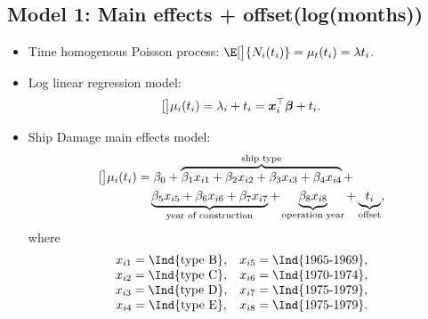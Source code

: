 \documentclass{article}\usepackage[]{graphicx}\usepackage[svgnames]{xcolor}
\let\log\relax%
\providecommand{\Vector}[1]{\bm{#1}}%
\begin{document}
\subsection*{Model 1: Main effects + offset(log(months))}
\begin{itemize}
      \item Time homogenous Poisson process: $ \E[\big]{N_i(t_i)}=\mu_t(t_i)=\lambda t_i $.
      \item Log linear regression model:
            \[ \log[\big]{\mu_i(t_i)}=\log{\lambda_i}+\log{t_i}=\Vector{x}_i^\top \Vector{\beta}+\log{t_i}. \]
      \item Ship Damage main effects model:
            \begin{align*}
                  \log[\big]{\mu_i(t_i)}
                   & =\beta_0+\overbrace{\beta_1x_{i1}+\beta_2x_{i2}+\beta_3x_{i3}+\beta_4x_{i4}}^{\text{ship type}}+ \\
                   & \quad \underbrace{\beta_5x_{i5}+\beta_6x_{i6}+\beta_7x_{i7}}_{\text{year of construction}}+
                  \underbrace{\beta_8x_{i8}}_{\text{operation year}}+\underbrace{\log{t_i}}_{\text{offset}},
            \end{align*}
            where
            \[ \begin{array}{cc}
                        x_{i1}=\Ind{\text{type B}}, & x_{i5}=\Ind{\text{1965-1969}}, \\
                        x_{i2}=\Ind{\text{type C}}, & x_{i6}=\Ind{\text{1970-1974}}, \\
                        x_{i3}=\Ind{\text{type D}}, & x_{i7}=\Ind{\text{1975-1979}}, \\
                        x_{i4}=\Ind{\text{type E}}, & x_{i8}=\Ind{\text{1975-1979}}. \\
                  \end{array} \]
\end{itemize}
\end{document}
